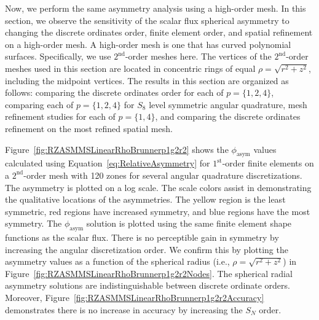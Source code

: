 \documentclass[12pt,letterpaper]{article}
\begin{document}
\FloatBarrier

\label{subsec:HOMesh}
Now, we perform the same asymmetry analysis using a high-order mesh. In this section, we observe the sensitivity of the scalar flux spherical asymmetry to changing the discrete ordinates order, finite element order, and spatial refinement on a high-order mesh. A high-order mesh is one that has curved polynomial surfaces. Specifically, we use $2^\text{nd}$-order meshes here. The vertices of the $2^\text{nd}$-order meshes used in this section are located in concentric rings of equal $\rho=\sqrt{r^2+z^2}$, including the midpoint vertices. The results in this section are organized as follows: comparing the discrete ordinates order for each of $p=\{1,2,4\}$, comparing each of $p=\{1,2,4\}$ for $S_8$ level symmetric angular quadrature, mesh refinement studies for each of $p=\{1,4\}$, and comparing the discrete ordinates refinement on the most refined spatial mesh.

Figure~\ref{fig:RZASMMSLinearRhoBrunnerp1g2r2} shows the $\phi_\text{asym}$ values calculated using Equation~\ref{eq:RelativeAsymmetry} for $1^\text{st}$-order finite elements on a $2^\text{nd}$-order mesh with 120 zones for several angular quadrature discretizations. The asymmetry is plotted on a log scale. The scale colors assist in demonstrating the qualitative locations of the asymmetries. The yellow region is the least symmetric, red regions have increased symmetry, and blue regions have the most symmetry. The $\phi_\text{asym}$ solution is plotted using the same finite element shape functions as the scalar flux. There is no perceptible gain in symmetry by increasing the angular discretization order. We confirm this by plotting the asymmetry values as a function of the spherical radius (i.e., $\rho=\sqrt{r^2+z^2}$) in Figure~\ref{fig:RZASMMSLinearRhoBrunnerp1g2r2Nodes}. The spherical radial asymmetry solutions are indistinguishable between discrete ordinate orders. Moreover, Figure~\ref{fig:RZASMMSLinearRhoBrunnerp1g2r2Accuracy} demonstrates there is no increase in accuracy by increasing the $S_N$ order.
\end{document}
